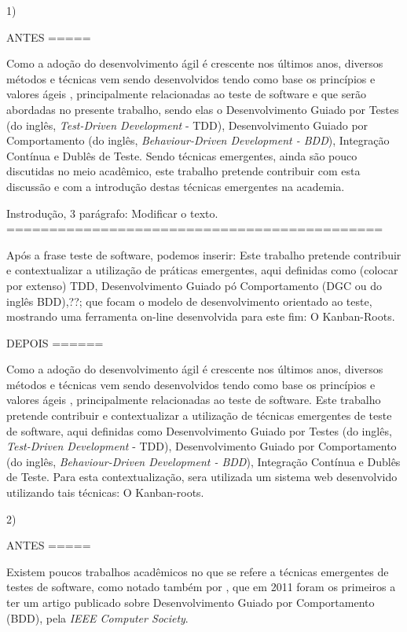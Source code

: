 1)

  ANTES
  =====

  Como a adoção do desenvolvimento ágil é crescente nos últimos anos, diversos métodos e técnicas vem sendo desenvolvidos tendo como base os princípios e valores ágeis \cite{BDDRodrigo}, principalmente relacionadas ao teste de software e que serão abordadas no presente trabalho, sendo elas o Desenvolvimento Guiado por Testes (do inglês, \textit{Test-Driven Development} - TDD), Desenvolvimento Guiado por Comportamento (do inglês, \textit{Behaviour-Driven Development - BDD}), Integração Contínua e Dublês de Teste. Sendo técnicas emergentes, ainda são pouco discutidas no meio acadêmico, este trabalho pretende contribuir com esta discussão e com a introdução destas técnicas emergentes na academia.


  Instrodução, 3 parágrafo: Modificar o texto.
  ============================================

  Após a frase teste de software, podemos inserir: Este trabalho pretende contribuir e contextualizar a utilização de práticas emergentes, aqui definidas como (colocar por extenso) TDD, Desenvolvimento Guiado pó Comportamento (DGC ou do inglês BDD),??;  que focam o modelo de desenvolvimento orientado ao teste, mostrando uma ferramenta on-line desenvolvida para este fim: O Kanban-Roots.



  DEPOIS
  ======

  Como a adoção do desenvolvimento ágil é crescente nos últimos anos, diversos métodos e técnicas vem sendo desenvolvidos tendo como base os princípios e valores ágeis \cite{BDDRodrigo}, principalmente relacionadas ao teste de software. Este trabalho pretende contribuir e contextualizar a utilização de técnicas emergentes de teste de software, aqui definidas como Desenvolvimento Guiado por Testes (do inglês, \textit{Test-Driven Development} - TDD), Desenvolvimento Guiado por Comportamento (do inglês, \textit{Behaviour-Driven Development - BDD}), Integração Contínua e Dublês de Teste. Para esta contextualização, sera utilizada um sistema web desenvolvido utilizando tais técnicas: O Kanban-roots.


2)

  ANTES
  =====

  Existem poucos trabalhos acadêmicos no que se refere a técnicas emergentes de testes de software, como notado também por , que em 2011 foram os primeiros a ter um artigo publicado sobre Desenvolvimento Guiado por Comportamento (BDD), pela \textit{IEEE Computer Society}.

